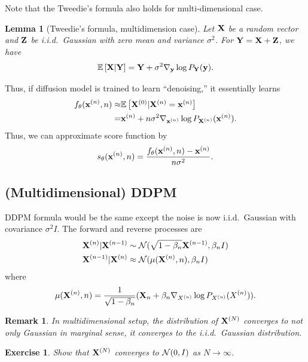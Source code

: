 \documentclass[11pt]{article}
\newtheorem{exercise}{Exercise}
\newtheorem{remark}{Remark}
\newtheorem{lemma}{Lemma}
\begin{document}
Note that the Tweedie's formula also holds for multi-dimensional case.
\begin{lemma}[Tweedie's formula, multidimension case]
Let ${\bf X}$ be a random vector and ${\bf Z}$ be i.i.d.~Gaussian with zero mean and variance $\sigma^2$.
For ${\bf Y} = {\bf X} + {\bf Z}$, we have
\begin{align}
    \Expec{\bX|\bY} = \bY + \sigma^2 \nabla_{\by} \log P_{\bY} (\by).
\end{align}
\end{lemma}

Thus, if diffusion model is trained to learn ``denoising,'' it essentially learns
\begin{align}
    f_{\theta}(\bx^{(n)}, n) \approx& \Expec{\bX^{(0)}| \bX^{(n)}=\bx^{(n)}}\\
    =& \bx^{(n)} + n\sigma^2 \nabla_{\bx^{(n)}} \log P_{\bX^{(n)}}(\bx^{(n)}).
\end{align}
Thus, we can approximate score function by
\begin{align}
    s_{\theta}({\bf x}^{(n)}, n) = \frac{f_{\theta}({\bf x}^{(n)}, n) - {\bf x}^{(n)}}{n\sigma^2}.
\end{align}



\subsection{(Multidimensional) DDPM~\cite{ho2020denoising}}
DDPM formula would be the same except the noise is now i.i.d.~Gaussian with covariance $\sigma^2 I$.
The forward and reverse processes are
\begin{align}
    {\bf X}^{(n)}|{\bf X}^{(n-1)} &\sim {\cal N}(\sqrt{1-\beta_n}{\bf X}^{(n-1)}, \beta_nI)\\
    {\bf X}^{(n-1)}|{\bf X}^{(n)} &\approx {\cal N}(\mu({\bf X}^{(n)}, n), \beta_nI)
\end{align}
where 
\begin{align}
    \mu({\bf X}^{(n)}, n) = \frac{1}{\sqrt{1-\beta_n}} ({\bf X}_n + \beta_n \nabla_{X^{(n)}}\log P_{X^{(n)}} (X^{(n)})).
\end{align}

\begin{remark}
    In multidimensional setup, the distribution of ${\bf X}^{(N)}$ converges to not only Gaussian in marginal sense,
    it converges to the i.i.d.~Gaussian distribution.
\end{remark}
\begin{exercise}
    Show that ${\bf X}^{(N)}$ converges to ${\cal N}(0, I)$ as $N\rightarrow\infty$.
\end{exercise}
\end{document}
